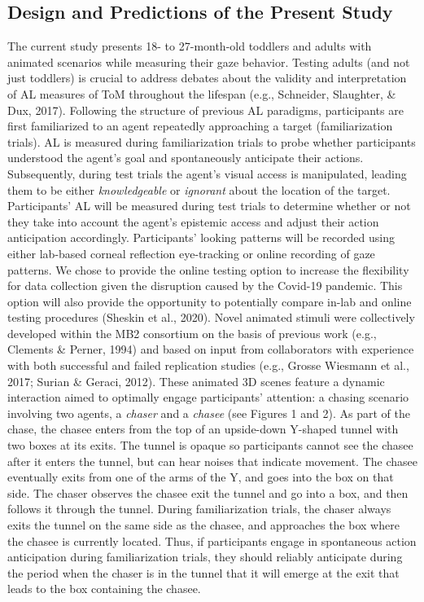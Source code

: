 \documentclass[
  man,floatsintext]{apa6}
\begin{document}
\subsection{Design and Predictions of the Present Study}\label{design-and-predictions-of-the-present-study}

The current study presents 18- to 27-month-old toddlers and adults with animated scenarios while measuring their gaze behavior. Testing adults (and not just toddlers) is crucial to address debates about the validity and interpretation of AL measures of ToM throughout the lifespan (e.g., Schneider, Slaughter, \& Dux, 2017). Following the structure of previous AL paradigms, participants are first familiarized to an agent repeatedly approaching a target (familiarization trials). AL is measured during familiarization trials to probe whether participants understood the agent's goal and spontaneously anticipate their actions. Subsequently, during test trials the agent's visual access is manipulated, leading them to be either \emph{knowledgeable} or \emph{ignorant} about the location of the target. Participants' AL will be measured during test trials to determine whether or not they take into account the agent's epistemic access and adjust their action anticipation accordingly. Participants' looking patterns will be recorded using either lab-based corneal reflection eye-tracking or online recording of gaze patterns. We chose to provide the online testing option to increase the flexibility for data collection given the disruption caused by the Covid-19 pandemic. This option will also provide the opportunity to potentially compare in-lab and online testing procedures (Sheskin et al., 2020).
Novel animated stimuli were collectively developed within the MB2 consortium on the basis of previous work (e.g., Clements \& Perner, 1994) and based on input from collaborators with experience with both successful and failed replication studies (e.g., Grosse Wiesmann et al., 2017; Surian \& Geraci, 2012). These animated 3D scenes feature a dynamic interaction aimed to optimally engage participants' attention: a chasing scenario involving two agents, a \emph{chaser} and a \emph{chasee} (see Figures 1 and 2). As part of the chase, the chasee enters from the top of an upside-down Y-shaped tunnel with two boxes at its exits. The tunnel is opaque so participants cannot see the chasee after it enters the tunnel, but can hear noises that indicate movement. The chasee eventually exits from one of the arms of the Y, and goes into the box on that side. The chaser observes the chasee exit the tunnel and go into a box, and then follows it through the tunnel. During familiarization trials, the chaser always exits the tunnel on the same side as the chasee, and approaches the box where the chasee is currently located. Thus, if participants engage in spontaneous action anticipation during familiarization trials, they should reliably anticipate during the period when the chaser is in the tunnel that it will emerge at the exit that leads to the box containing the chasee.
\end{document}
